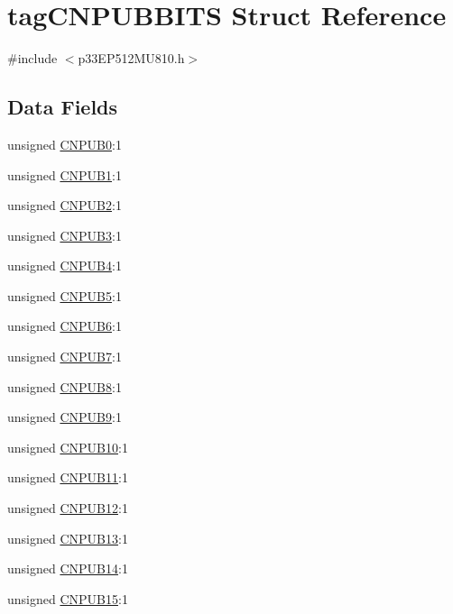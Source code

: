 \hypertarget{structtag_c_n_p_u_b_b_i_t_s}{}\section{tag\+C\+N\+P\+U\+B\+B\+I\+TS Struct Reference}
\label{structtag_c_n_p_u_b_b_i_t_s}


{\ttfamily \#include $<$p33\+E\+P512\+M\+U810.\+h$>$}

\subsection*{Data Fields}
\begin{DoxyCompactItemize}
\item 
unsigned \hyperlink{structtag_c_n_p_u_b_b_i_t_s_aec4b5bf06c64cb7927600e1849f291b8}{C\+N\+P\+U\+B0}\+:1
\item 
unsigned \hyperlink{structtag_c_n_p_u_b_b_i_t_s_a0861a2ff025bc5285a4ee3bccd183077}{C\+N\+P\+U\+B1}\+:1
\item 
unsigned \hyperlink{structtag_c_n_p_u_b_b_i_t_s_a09e7adf1463a24b48a757dbaa09ddb28}{C\+N\+P\+U\+B2}\+:1
\item 
unsigned \hyperlink{structtag_c_n_p_u_b_b_i_t_s_a8caafbc5ec582445f37927bbcd784e56}{C\+N\+P\+U\+B3}\+:1
\item 
unsigned \hyperlink{structtag_c_n_p_u_b_b_i_t_s_af3b439b4035cbb0f21b4c131f2eae2b0}{C\+N\+P\+U\+B4}\+:1
\item 
unsigned \hyperlink{structtag_c_n_p_u_b_b_i_t_s_ae4014a4787a2289edd4d643633e66d3d}{C\+N\+P\+U\+B5}\+:1
\item 
unsigned \hyperlink{structtag_c_n_p_u_b_b_i_t_s_a419aa78b6aaa93a6b46d0659af384223}{C\+N\+P\+U\+B6}\+:1
\item 
unsigned \hyperlink{structtag_c_n_p_u_b_b_i_t_s_a3dbf4d8783c60d87331e533bc874ad4a}{C\+N\+P\+U\+B7}\+:1
\item 
unsigned \hyperlink{structtag_c_n_p_u_b_b_i_t_s_aaae4caa65429753f8714c166e77202b1}{C\+N\+P\+U\+B8}\+:1
\item 
unsigned \hyperlink{structtag_c_n_p_u_b_b_i_t_s_acc20cf498490985873d647d5b7cceebb}{C\+N\+P\+U\+B9}\+:1
\item 
unsigned \hyperlink{structtag_c_n_p_u_b_b_i_t_s_a2c042fc30ebb321f8cf158825203e559}{C\+N\+P\+U\+B10}\+:1
\item 
unsigned \hyperlink{structtag_c_n_p_u_b_b_i_t_s_a0266e5052f194d5632910f99367b6f8c}{C\+N\+P\+U\+B11}\+:1
\item 
unsigned \hyperlink{structtag_c_n_p_u_b_b_i_t_s_a47435a61b569f367902b5f9f039e3341}{C\+N\+P\+U\+B12}\+:1
\item 
unsigned \hyperlink{structtag_c_n_p_u_b_b_i_t_s_ac6f9ef6e6ca0cc1f268c4cb976247622}{C\+N\+P\+U\+B13}\+:1
\item 
unsigned \hyperlink{structtag_c_n_p_u_b_b_i_t_s_ab54cf9a08a52ca5ba1f7fc8b58c2c2ac}{C\+N\+P\+U\+B14}\+:1
\item 
unsigned \hyperlink{structtag_c_n_p_u_b_b_i_t_s_a4bdbdde6117506362fc012245f3f4513}{C\+N\+P\+U\+B15}\+:1
\end{DoxyCompactItemize}


